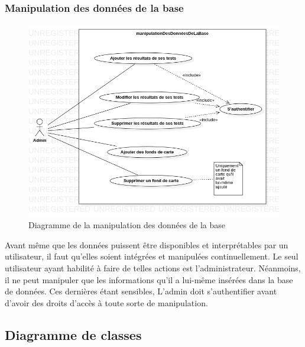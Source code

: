 \subsubsection{Manipulation des données de la base}
    \paragraph{}
    \begin{figure}
        \centering
        \includegraphics[width=1\textwidth]{images/Analyse_des_besoins/manipulationDesDonneesDeLaBase.png}
        \caption{Diagramme de la manipulation des données de la base}
    \end{figure}
    \par 
    Avant même que les données puissent être disponibles et interprétables 
    par un utilisateur, il faut qu'elles soient intégrées et manipulées continuellement. Le 
    seul utilisateur ayant habilité à faire de telles 
    actions est l'administrateur. Néanmoins, il ne peut manipuler que les informations 
    qu'il a lui-même insérées dans la base de données. Ces dernières étant sensibles, L'admin 
    doit s'authentifier avant d'avoir des droits d'accès à toute sorte de manipulation.

    \subsection{Diagramme de classes}
